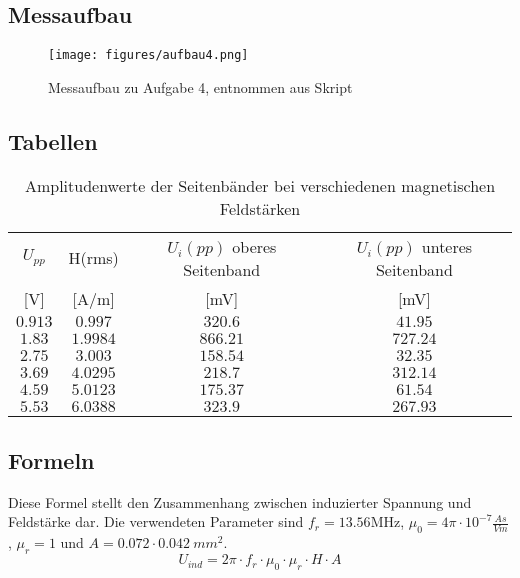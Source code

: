 \documentclass[12pt,a4paper,ngerman]{article}
\begin{document}
\subsection{Messaufbau}

\begin{figure}[H]
\centering
\texttt{[image: figures/aufbau4.png]} 
\caption{Messaufbau zu Aufgabe 4, entnommen aus Skript \cite[S.39 Abbildung 42]{skript}}
\label{fig:aufbau4}
\end{figure}

\subsection{Tabellen}

\begin{table}[H]
\begin{center}
\begin{tabular}{ |c|c|c|c| }
  \hline
    $U_{pp}$ & H(rms) & $U_i(pp)$ oberes Seitenband & $U_i(pp)$ unteres Seitenband \\
	 {[V]} & {[A/m]} & {[mV]} & {[mV]} \\
  \hline
  $0.913$ & $0.997$ & $320.6$ & $41.95$\\
  \hline
  $1.83$ & $1.9984$ & $866.21$ & $727.24$ \\
  \hline
  $2.75$ & $3.003$ & $158.54$ & $32.35$\\
  \hline
  $3.69$ & $4.0295$ & $218.7$ & $312.14$\\
    \hline
  $4.59$ & $5.0123$ & $175.37$ & $61.54$\\
    \hline
  $5.53$ & $6.0388$ & $323.9$ & $267.93$ \\
    \hline 
\end{tabular}
\caption{Amplitudenwerte der Seitenbänder bei verschiedenen magnetischen Feldstärken}
\label{tab:ue4}
\end{center}
\end{table} 

\subsection{Formeln}
Diese Formel stellt den Zusammenhang zwischen induzierter Spannung und Feldstärke dar. Die verwendeten Parameter sind $f_r = 13.56$MHz, $\mu_0 = 4\pi \cdot 10^{-7}\frac{As}{Vm}$, $\mu_r = 1$ und $A = 0.072 \cdot 0.042\ mm^2$.
\begin{equation}
U_{ind} = 2\pi \cdot f_r \cdot \mu_0 \cdot \mu_r \cdot H \cdot A
\end{equation}
\end{document}
